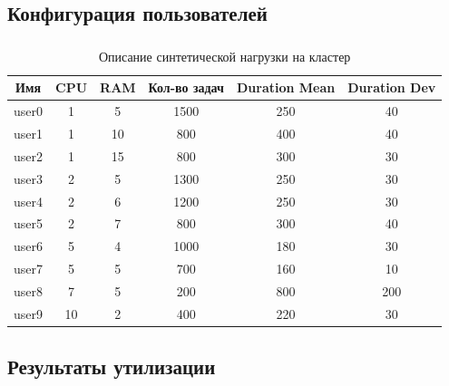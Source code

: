 \documentclass[t]{beamer}  %
\begin{document}
\subsection{Конфигурация пользователей}

\begin{frame}[fragile]
	\frametitle{\insertsection} 
	\framesubtitle{\insertsubsection}

	\vspace{0.5cm}
	
	\begin{table}[H]
		\footnotesize
		\centering
		\begin{tabular}{|c|c|c|c|c|c|}
			\hline
			\textbf{Имя} & \textbf{CPU} & \textbf{RAM} & \textbf{Кол-во задач} & \textbf{Duration Mean} & \textbf{Duration Dev} \\
			\hline
			user0 & 1 & 5 & 1500 & 250 & 40 \\
			\hline
			user1 & 1 & 10 & 800 & 400 & 40 \\
			\hline
			user2 & 1 & 15 & 800 & 300 & 30 \\
			\hline
			user3 & 2 & 5 & 1300 & 250 & 30 \\
			\hline
			user4 & 2 & 6 & 1200 & 250 & 30 \\
			\hline
			user5 & 2 & 7 & 800 & 300 & 40 \\
			\hline
			user6 & 5 & 4 & 1000 & 180 & 30 \\
			\hline
			user7 & 5 & 5 & 700 & 160 & 10 \\
			\hline
			user8 & 7 & 5 & 200 & 800 & 200 \\
			\hline
			user9 & 10 & 2 & 400 & 220 & 30 \\
			\hline
		\end{tabular}
		\caption*{Описание синтетической нагрузки на кластер}
	\end{table}

\end{frame}

\subsection{Результаты утилизации}
\end{document}
